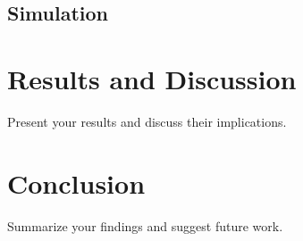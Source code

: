 \documentclass[11pt, journal]{IEEEtran}
\begin{document}
\subsection{Simulation\label{sec:simulation}}

\section{Results and Discussion}
Present your results and discuss their implications.

\section{Conclusion}
Summarize your findings and suggest future work.



\end{document}
